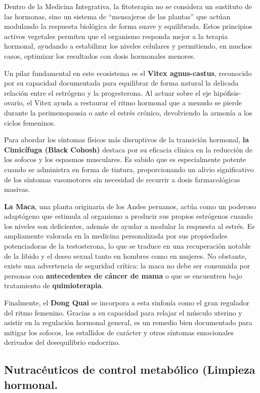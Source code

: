 \documentclass[
  spanish,
]{article}
\begin{document}
Dentro de la Medicina Integrativa, la fitoterapia no se considera un sustituto de las hormonas, sino un sistema de ``mensajeros de las plantas'' que actúan modulando la respuesta biológica de forma suave y equilibrada. Estos principios activos vegetales permiten que el organismo responda mejor a la terapia hormonal, ayudando a estabilizar los niveles celulares y permitiendo, en muchos casos, optimizar los resultados con dosis hormonales menores.

Un pilar fundamental en este ecosistema es el \textbf{Vitex agnus-castus}, reconocido por su capacidad documentada para equilibrar de forma natural la delicada relación entre el estrógeno y la progesterona. Al actuar sobre el eje hipófisis-ovario, el Vitex ayuda a restaurar el ritmo hormonal que a menudo se pierde durante la perimenopausia o ante el estrés crónico, devolviendo la armonía a los ciclos femeninos.

Para abordar los síntomas físicos más disruptivos de la transición hormonal, \textbf{la Cimicífuga (Black Cohosh)} destaca por su eficacia clínica en la reducción de los sofocos y los espasmos musculares. Es sabido que es especialmente potente cuando se administra en forma de tintura, proporcionando un alivio significativo de los síntomas vasomotores sin necesidad de recurrir a dosis farmacológicas masivas.

\textbf{La Maca}, una planta originaria de los Andes peruanos, actúa como un poderoso adaptógeno que estimula al organismo a producir sus propios estrógenos cuando los niveles son deficientes, además de ayudar a modular la respuesta al estrés. Es ampliamente valorada en la medicina personalizada por sus propiedades potenciadoras de la testosterona, lo que se traduce en una recuperación notable de la libido y el deseo sexual tanto en hombres como en mujeres. No obstante, existe una advertencia de seguridad crítica: la maca no debe ser consumida por personas con \textbf{antecedentes de cáncer de mama} o que se encuentren bajo tratamiento de \textbf{quimioterapia}.

Finalmente, el \textbf{Dong Quai} se incorpora a esta sinfonía como el gran regulador del ritmo femenino. Gracias a su capacidad para relajar el músculo uterino y asistir en la regulación hormonal general, es un remedio bien documentado para mitigar los sofocos, los estallidos de carácter y otros síntomas emocionales derivados del desequilibrio endocrino.

\subsection{Nutracéuticos de control metabólico (Limpieza hormonal.}\label{nutracuxe9uticos-de-control-metabuxf3lico-limpieza-hormonal.}
\end{document}
